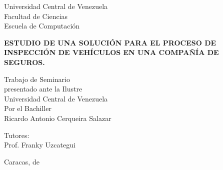 \begin{center}
	Universidad Central de Venezuela\\
	Facultad de Ciencias\\
	Escuela de Computación\\
	
\end{center}

\vspace{2.5cm}
\begin{center}
	\large{\textbf{ ESTUDIO DE UNA SOLUCIÓN PARA EL PROCESO DE INSPECCIÓN DE VEHÍCULOS EN UNA COMPAÑÍA DE SEGUROS. }}
\end{center}

\vspace{6.0cm}
\begin{center}
	Trabajo de Seminario \\
	presentado ante la Ilustre\\
	Universidad Central de Venezuela\\
	Por el Bachiller\\
	Ricardo Antonio Cerqueira Salazar\\
\end{center}

\begin{center}
	Tutores:\\ Prof. Franky Uzcategui\\
\end{center}

\vspace{1.0cm}
\begin{center}
	Caracas, \monthname[\month] de \the\year
\end{center}